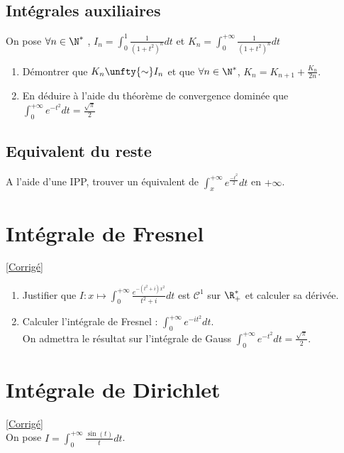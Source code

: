 \documentclass{book}
\begin{document}
	\subsection{Intégrales auxiliaires }
	On pose $\forall n \in \N^{*}$ , $I_n=\displaystyle\int_0^1 \frac{1}{(1+t^2)^n}dt$ et $K_n=\displaystyle\int_0^{+\infty} \frac{1}{(1+t^2)^n}dt$
	\begin{enumerate}
		\item Démontrer que $K_n \unfty{\sim} I_n$ et que $\forall n \in \N^*$, $ K_n=K_{n+1}+\displaystyle\frac{K_n}{2n}$.
		\item En déduire à l'aide du théorème de convergence dominée que $\displaystyle\int_0^{+\infty} e^{-t^2}dt=\frac{\sqrt{\pi}}{2}$
	\end{enumerate}
	
	\subsection{Equivalent du reste }
	A l'aide d'une IPP, trouver un équivalent de $\displaystyle\int_x^{+\infty}e^{\frac{-t^2}{2}}dt$ en $+\infty$.
	
	\section{Intégrale de Fresnel }
	\textcolor{blue}{\hyperref[Intégrale de Fresnel corrigé]{[Corrigé]}}\\
		\label{fresnel}
		\label{Intégrale de Fresnel}
	\begin{enumerate}[leftmargin=*]
		\item Justifier que $I:x\mapsto\displaystyle\int_0^{+\infty}\frac{e^{-(t^2+i)x^2}}{t^2+i}dt$ est $\mathcal C^1$ sur $\R^*_+$ et calculer sa dérivée.
		\item Calculer l'intégrale de Fresnel : $\displaystyle\int_0^{+\infty}e^{-it^2}dt$.\\
		On admettra le résultat sur l'intégrale de Gauss $\displaystyle\int_0^{+\infty}e^{-t^2}dt=\frac{\sqrt{\pi}}{2}$.
	\end{enumerate}
	
	\section{Intégrale de Dirichlet}
	\textcolor{blue}{\hyperref[Intégrale de Dirichlet corrigé]{[Corrigé]}}\\
	\label{dirichlet}
	\label{Intégrale de Dirichlet}
	On pose $I=\displaystyle\int_0^{+\infty} \frac{\sin(t)}{t}dt$.
	
\end{document}
